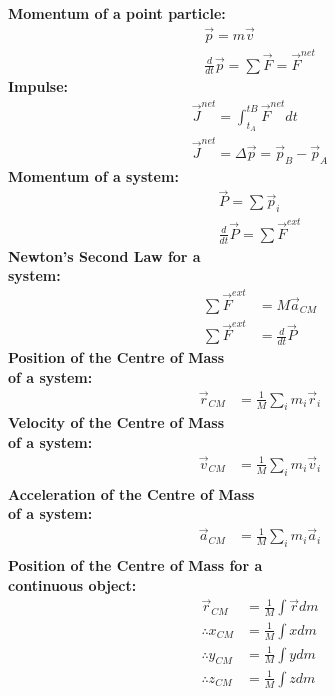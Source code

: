 \newpage
\begin{importantEquations}
\medskip
\begin{multicols}{2}
\textbf{Momentum of a point particle:}
\begin{align*}
\vec p = m\vec v \\
\frac{d}{dt}\vec p = \sum \vec F = \vec F^{net}
\end{align*}
\textbf{Impulse:}
\begin{align*}
\vec J^{net} = \int_{t_A}^{tB} \vec F^{net} dt \\
\vec J^{net} = \Delta \vec p = \vec p_B - \vec p_A
\end{align*}
\textbf{Momentum of a system:}
\begin{align*}
\vec P = \sum \vec p_i \\
\frac{d}{dt}\vec P = \sum \vec F^{ext}
\end{align*}
\textbf{Newton's Second Law for a \\ system:}
\begin{align*}
\sum \vec F^{ext} &= M \vec a_{CM}\\
\sum \vec F^{ext} &=\frac{d}{dt} \vec P
\end{align*}
\columnbreak
\textbf{Position of the Centre of Mass \\ of a system:}
\begin{align*}
\vec r_{CM} &=\frac{1}{M}\sum_i m_i\vec r_i 
\end{align*}
\textbf{Velocity of the Centre of Mass \\ of a system:}
\begin{align*}
\vec v_{CM} &= \frac{1}{M}\sum_i m_i\vec v_i \\
\end{align*}
\textbf{Acceleration of the Centre of Mass \\ of a system:}
\begin{align*}
\vec a_{CM} &=  \frac{1}{M}\sum_i m_i\vec a_i \\
\end{align*}
\textbf{Position of the Centre of Mass for a \\ continuous object:}
\begin{align*}
\vec r_{CM} &=\frac{1}{M}\int \vec r dm\\
\therefore x_{CM} &= \frac{1}{M}\int x dm\\
\therefore y_{CM} &=  \frac{1}{M}\int y dm\\
\therefore z_{CM} &=  \frac{1}{M}\int z dm
\end{align*}
\medskip
\end{multicols}
\end{importantEquations}


